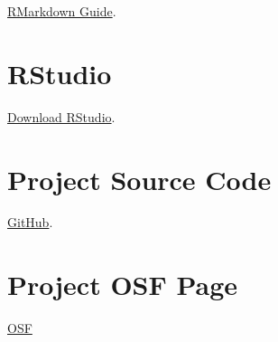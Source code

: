 \documentclass[
]{book}
\begin{document}
\href{https://bookdown.org/yihui/rmarkdown/}{RMarkdown Guide}.

\hypertarget{rstudio}{%
\section*{RStudio}\label{rstudio}}

\href{https://rstudio.com/products/rstudio/download/\#download}{Download RStudio}.

\hypertarget{project-source-code}{%
\section*{Project Source Code}\label{project-source-code}}

\href{https://github.com/Peter-Kedron/COVID-19-Digital-Contact-Tracing-and-Geospatial-Technologies-and-Privacy}{GitHub}.

\hypertarget{project-osf-page}{%
\section*{Project OSF Page}\label{project-osf-page}}

\href{https://osf.io/kpvbq/}{OSF}

  
\end{document}
